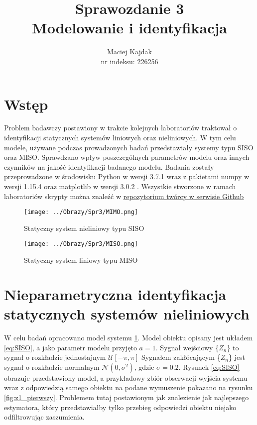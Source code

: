 \documentclass[12pt,a4paper]{article}
\author{Maciej Kajdak\\nr indeksu: 226256}
\title{Sprawozdanie 3 \\ \textbf{Modelowanie i identyfikacja}}
\begin{document}
\maketitle
\section{Wstęp}
Problem badawczy postawiony w trakcie kolejnych laboratoriów traktował o identyfikacji statycznych systemów liniowych oraz nieliniowych.
W tym celu modele, używane podczas prowadzonych badań przedstawiały systemy typu SISO oraz MISO.
Sprawdzano wpływ poszczególnych parametrów modelu oraz innych czynników na jakość identyfikacji badanego modelu.
Badania zostały przeprowadzone w środowisku Python w wersji 3.7.1 \cite{python3} wraz z pakietami numpy w wersji 1.15.4 \cite{numpy} oraz matplotlib w wersji 3.0.2 \cite{matplotlib}.
Wszystkie stworzone w ramach laboratoriów skrypty można znaleźć w \href{https://github.com/MacAndKaj/Modeling\_and\_Identification}{\underline{repozytorium twórcy w serwisie Github}}


\begin{multicols}{2}
		\begin{figure}[H]
		\centering
		\texttt{[image: ../Obrazy/Spr3/MIMO.png]} 
		\caption{Statyczny system nieliniowy typu SISO}
		\label{fig:SISO}
		\end{figure}
	\columnbreak		
		\begin{figure}[H]
		\centering
		\texttt{[image: ../Obrazy/Spr3/MISO.png]} 
		\caption{Statyczny system liniowy typu MISO}
		\label{fig:MISO}
		\end{figure}
\end{multicols}

\newpage
\section{Nieparametryczna identyfikacja statycznych systemów nieliniowych}
W celu badań opracowano model systemu \ref{fig:SISO}. Model obiektu opisany jest układem \ref{eq:SISO}, a jako parametr modelu przyjęto $a=1$.
Sygnał wejściowy \{$Z_{n}$\} to sygnał o rozkładzie jednostajnym $\mathcal{U}[-\pi,\pi]$
Sygnałem zakłócającym \{$Z_{n}$\} jest sygnał o rozkładzie normalnym $\mathcal{N}(0,\sigma^{2})$, gdzie $\sigma=0.2$.
Rysunek \ref{eq:SISO} obrazuje przedstawiony model, a przykładowy zbiór obserwacji wyjścia systemu wraz z odpowiedzią samego obiektu na podane wymuszenie pokazano na rysunku \ref{fig:z1_pierwszy}.
Problemem tutaj postawionym jak znalezienie jak najlepszego estymatora, który przedstawiałby tylko przebieg odpowiedzi obiektu niejako odfiltrowując zaszumienia.
\end{document}
